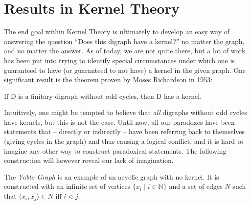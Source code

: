 \section{Results in Kernel Theory}
\label{sec:Results in Kernel Theory}
The end goal within Kernel Theory is ultimately to develop an easy way of answering the question ``Does this digraph have a kernel?'' no matter the graph, and no matter the answer.
As of today, we are not quite there, but a lot of work has been put into trying to identify special circumstances under which one is guaranteed to have (or guaranteed to not have) a kernel in the given graph.
One significant result is the theorem proven by Moses Richardson in 1953:
\begin{theorem}
  If D is a finitary digraph without odd cycles, then D has a kernel.
\end{theorem}
Intuitively, one might be tempted to believe that \textit{all} digraphs without odd cycles have kernels, but this is not the case.
Until now, all our paradoxes have been statements that -- directly or indirectly -- have been referring back to themselves (giving cycles in the graph) and thus causing a logical conflict, and it is hard to imagine any other way to construct paradoxical statements.
The following construction will however reveal our lack of imagination.

The \textit{Yablo Graph}\cite{analysis-yablo} is an example of an acyclic graph with no kernel.
It is constructed with an infinite set of vertices $\{ x_i \;|\; i \in \mathbb{N} \}$ and a set of edges $N$ such that $\langle x_i, x_j \rangle \in N$ iff $i < j$.

